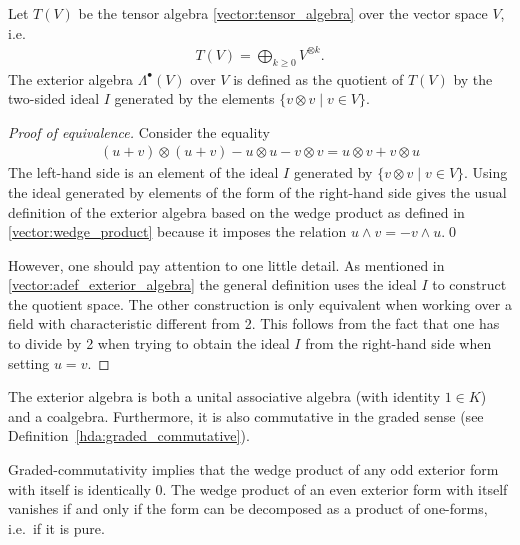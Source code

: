     \begin{adefinition}\label{vector:adef_exterior_algebra}
        Let $T(V)$ be the tensor algebra \ref{vector:tensor_algebra} over the vector space $V$, i.e.
        \begin{gather}
            T(V) = \bigoplus_{k\geq0}V^{\otimes k}.
        \end{gather}
        The exterior algebra $\Lambda^\bullet(V)$ over $V$ is defined as the quotient of $T(V)$ by the two-sided ideal $I$ generated by the elements $\{v\otimes v\mid v\in V\}$.
        \begin{mdframed}[roundcorner=10pt, linecolor=blue, linewidth=1pt]
            \begin{proof}[Proof of equivalence]
                Consider the equality
                \begin{gather}
                    (u+v)\otimes(u+v) - u\otimes u - v\otimes v = u\otimes v + v\otimes u
                \end{gather}
                The left-hand side is an element of the ideal $I$ generated by $\{v\otimes v\mid v\in V\}$. Using the ideal generated by elements of the form of the right-hand side gives the usual definition of the exterior algebra based on the wedge product as defined in \ref{vector:wedge_product} because it imposes the relation $u\wedge v = -v\wedge u$.\qed

                However, one should pay attention to one little detail. As mentioned in \ref{vector:adef_exterior_algebra} the general definition uses the ideal $I$ to construct the quotient space. The other construction is only equivalent when working over a field with characteristic different from 2. This follows from the fact that one has to divide by 2 when trying to obtain the ideal $I$ from the right-hand side when setting $u=v$.
            \end{proof}
        \end{mdframed}
    \end{adefinition}

    \begin{property}
        The exterior algebra is both a unital associative algebra (with identity $1\in K$) and a coalgebra. Furthermore, it is also commutative in the graded sense (see Definition~\ref{hda:graded_commutative}).
    \end{property}

    \begin{property}[Nilpotency]
        Graded-commutativity implies that the wedge product of any odd exterior form with itself is identically 0. The wedge product of an even exterior form with itself vanishes if and only if the form can be decomposed as a product of one-forms, i.e.~if it is pure.
    \end{property}

